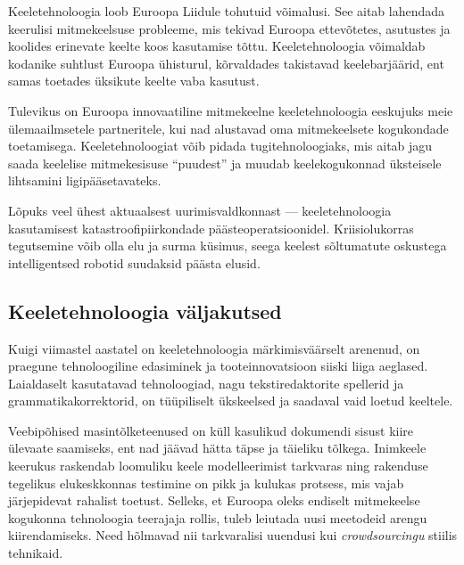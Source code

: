 \begin{multicols}{2}
Keeletehnoloogia loob Euroopa Liidule tohutuid võimalusi. 
See aitab lahendada keerulisi mitmekeelsuse probleeme, mis tekivad Euroopa ettevõtetes, asutustes ja koolides erinevate keelte koos kasutamise tõttu. 
Keeletehnoloogia võimaldab kodanike suhtlust Euroopa ühisturul, kõrvaldades takistavad keelebarjäärid, ent samas toetades üksikute keelte vaba kasutust.


Tulevikus on Euroopa innovaatiline mitmekeelne keeletehnoloogia eeskujuks meie ülemaailmsetele partneritele, kui nad alustavad oma mitmekeelsete kogukondade toetamisega. Keeletehnoloogiat võib pidada tugitehnoloogiaks, mis aitab jagu saada keelelise mitmekesisuse ``puu\-dest'' ja muudab keelekogukonnad üksteisele lihtsamini ligipääsetavateks.




Lõpuks veel ühest aktuaalsest uurimis\-vald\-konnast --- keeletehnoloogia kasutamisest katastroofipiirkondade pääste\-operatsioonidel. 
Kriisiolukorras tegutsemine võib olla elu ja surma küsimus, seega keelest sõltumatute oskustega intelligentsed robotid suudaksid päästa elusid.

\subsection{Keeletehnoloogia väljakutsed}

Kuigi viimastel aastatel on keeletehno\-loogia märkimisväärselt arenenud, on praegune tehnoloogiline edasiminek ja tooteinnovatsioon siiski liiga aeglased. 
Laial\-daselt kasutatavad tehnoloogiad, nagu tekstiredaktorite spellerid ja grammatika\-korrektorid, on tüüpiliselt ükskeelsed ja saadaval vaid loetud keeltele. 



Veebipõhised masintõlketeenused on küll kasulikud dokumendi sisust kiire ülevaate saamiseks, ent nad jäävad hätta täpse ja täieliku tõlkega. 
Inimkeele keerukus raskendab loomuliku keele modelleerimist tarkvaras ning raken\-duse tegelikus elukeskkonnas testimine on pikk ja kulukas protsess, mis vajab järjepidevat rahalist toetust. 
Sel\-leks, et Euroopa oleks endiselt mitmekeelse kogukonna tehnoloogia tee\-rajaja rollis, tuleb leiutada uusi meetodeid arengu kii\-ren\-da\-miseks. 
Need hõlmavad nii tark\-varalisi uuendusi kui \textit{crowdsourcingu} stiilis tehnikaid.


\end{multicols}
